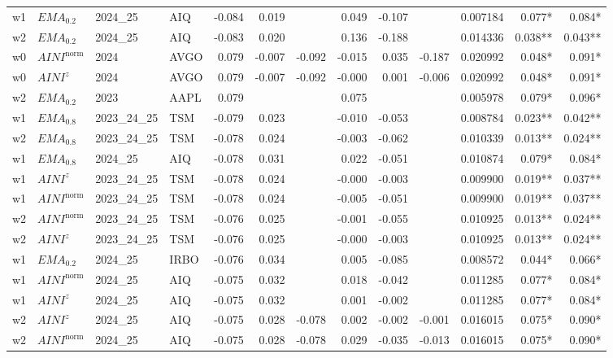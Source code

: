 \begin{longtable}{@{}llllrrrrrrrrr@{}}
w1 & $EMA_{0.2}$ & 2024\_25 & AIQ & -0.084 & 0.019 &  & 0.049 & -0.107 &  & 0.007184 & 0.077* & 0.084* \\
w2 & $EMA_{0.2}$ & 2024\_25 & AIQ & -0.083 & 0.020 &  & 0.136 & -0.188 &  & 0.014336 & 0.038** & 0.043** \\
w0 & $AINI^{\mathrm{norm}}$ & 2024 & AVGO & 0.079 & -0.007 & -0.092 & -0.015 & 0.035 & -0.187 & 0.020992 & 0.048* & 0.091* \\
w0 & $AINI^{z}$ & 2024 & AVGO & 0.079 & -0.007 & -0.092 & -0.000 & 0.001 & -0.006 & 0.020992 & 0.048* & 0.091* \\
w2 & $EMA_{0.2}$ & 2023 & AAPL & 0.079 &  &  & 0.075 &  &  & 0.005978 & 0.079* & 0.096* \\
w1 & $EMA_{0.8}$ & 2023\_24\_25 & TSM & -0.079 & 0.023 &  & -0.010 & -0.053 &  & 0.008784 & 0.023** & 0.042** \\
w2 & $EMA_{0.8}$ & 2023\_24\_25 & TSM & -0.078 & 0.024 &  & -0.003 & -0.062 &  & 0.010339 & 0.013** & 0.024** \\
w1 & $EMA_{0.8}$ & 2024\_25 & AIQ & -0.078 & 0.031 &  & 0.022 & -0.051 &  & 0.010874 & 0.079* & 0.084* \\
w1 & $AINI^{z}$ & 2023\_24\_25 & TSM & -0.078 & 0.024 &  & -0.000 & -0.003 &  & 0.009900 & 0.019** & 0.037** \\
w1 & $AINI^{\mathrm{norm}}$ & 2023\_24\_25 & TSM & -0.078 & 0.024 &  & -0.005 & -0.051 &  & 0.009900 & 0.019** & 0.037** \\
w2 & $AINI^{\mathrm{norm}}$ & 2023\_24\_25 & TSM & -0.076 & 0.025 &  & -0.001 & -0.055 &  & 0.010925 & 0.013** & 0.024** \\
w2 & $AINI^{z}$ & 2023\_24\_25 & TSM & -0.076 & 0.025 &  & -0.000 & -0.003 &  & 0.010925 & 0.013** & 0.024** \\
w1 & $EMA_{0.2}$ & 2024\_25 & IRBO & -0.076 & 0.034 &  & 0.005 & -0.085 &  & 0.008572 & 0.044* & 0.066* \\
w1 & $AINI^{\mathrm{norm}}$ & 2024\_25 & AIQ & -0.075 & 0.032 &  & 0.018 & -0.042 &  & 0.011285 & 0.077* & 0.084* \\
w1 & $AINI^{z}$ & 2024\_25 & AIQ & -0.075 & 0.032 &  & 0.001 & -0.002 &  & 0.011285 & 0.077* & 0.084* \\
w2 & $AINI^{z}$ & 2024\_25 & AIQ & -0.075 & 0.028 & -0.078 & 0.002 & -0.002 & -0.001 & 0.016015 & 0.075* & 0.090* \\
w2 & $AINI^{\mathrm{norm}}$ & 2024\_25 & AIQ & -0.075 & 0.028 & -0.078 & 0.029 & -0.035 & -0.013 & 0.016015 & 0.075* & 0.090* \\

\end{longtable}
